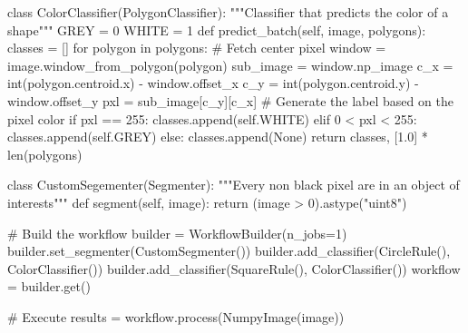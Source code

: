 \begin{python}[language=python,label={lst:toy_classify},caption={Toy example - Classifier}] 
class ColorClassifier(PolygonClassifier):
    """Classifier that predicts the color of a shape"""
    GREY = 0
    WHITE = 1
    def predict_batch(self, image, polygons):
        classes = []
        for polygon in polygons:
            # Fetch center pixel
            window = image.window_from_polygon(polygon)
            sub_image = window.np_image
            c_x = int(polygon.centroid.x) - window.offset_x
            c_y = int(polygon.centroid.y) - window.offset_y
            pxl = sub_image[c_y][c_x]
            # Generate the label based on the pixel color
            if pxl == 255:
                classes.append(self.WHITE)
            elif 0 < pxl < 255:
                classes.append(self.GREY)
            else:
                classes.append(None)
        return classes, [1.0] * len(polygons)

\end{python}

\begin{python}[language=python,label={lst:toy_segment},caption={Toy example - Segmentation implementation}] 
class CustomSegementer(Segmenter):
    """Every non black pixel are in an object of interests"""
    def segment(self, image):
        return (image > 0).astype("uint8")
\end{python}

\begin{python}[language=python,label={lst:toy_build_and_call},caption={Toy example - Applying the framework}] 
# Build the workflow
builder = WorkflowBuilder(n_jobs=1)
builder.set_segmenter(CustomSegmenter())
builder.add_classifier(CircleRule(), ColorClassifier())
builder.add_classifier(SquareRule(), ColorClassifier())
workflow = builder.get()

# Execute
results = workflow.process(NumpyImage(image))
\end{python}
